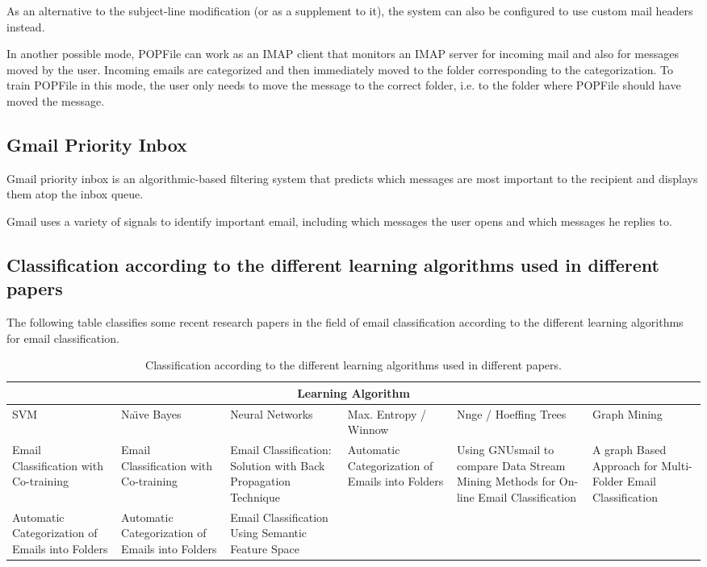 As an alternative to the subject-line modification (or as a supplement to it), the system can also be configured to use custom mail headers instead.

In another possible mode, POPFile can work as an IMAP client that monitors an IMAP server for incoming mail and also for messages moved by the user. Incoming emails are categorized and then immediately moved to the folder corresponding to the categorization. To train POPFile in this mode, the user only needs to move the message to the correct folder, i.e. to the folder where POPFile should have moved the message.

\subsection{Gmail Priority Inbox}
Gmail priority inbox is an algorithmic-based filtering system that predicts which messages are most important to the recipient and displays them atop the inbox queue.

Gmail uses a variety of signals to identify important email, including which messages the user opens and which messages he replies to.

\subsection{Classification according to the different learning algorithms used in different papers}
The following table classifies some recent research papers in the field of email classification according to the different learning algorithms for email classification.
\begin{center}
\begin{table}
\begin{tabular}{|p{2cm}|p{2cm}|p{2cm}|p{2cm}|p{2cm}|p{2cm}|}
\hline
\multicolumn{6}{|c|}{Learning Algorithm} \\
\hline
SVM & Na\"{\i}ve Bayes & Neural Networks & Max. Entropy / Winnow & Nnge / Hoeffing Trees & Graph Mining \\ \hline
Email Classification with Co-training \cite{SVETLANA01} &
Email Classification with Co-training \cite{SVETLANA01} &
Email Classification: Solution with Back Propagation Technique \cite{mous05} & 
Automatic Categorization of Emails into Folders \cite{RON04} &
Using GNUsmail to compare Data Stream Mining Methods for On-line Email Classification \cite{JOSE11} &
A graph Based Approach for Multi-Folder Email Classification \cite{sift02} \\ \hline

Automatic Categorization of Emails into Folders \cite{RON04} &
Automatic Categorization of Emails into Folders \cite{RON04} &
Email Classification Using Semantic Feature Space \cite{YUN08} & 
&
& \\ \hline
\end{tabular}
\caption{Classification according to the different learning algorithms used in different papers.}
\end{table}
\end{center}
\newpage

